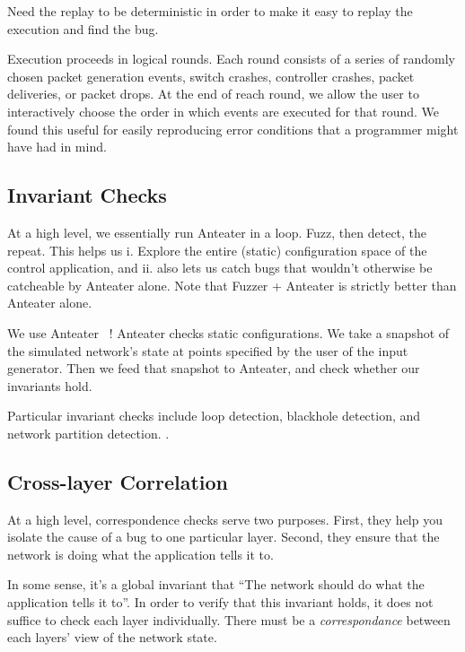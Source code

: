 Need the replay to be deterministic in order to make it easy to replay the execution
and find the bug.

Execution proceeds in logical rounds. Each round consists of a series of
randomly chosen packet generation events, switch crashes, controller crashes,
packet deliveries, or packet drops. At the end of reach round, we allow the user to
interactively choose the order in which events are executed for that round. We
found this useful for easily reproducing error conditions that a programmer
might have had in mind. 


\subsection{Invariant Checks}
\label{sec:invariant_checks}

At a high level, we essentially run Anteater in a loop. Fuzz, then detect, the
repeat. This helps us i. Explore the entire (static) configuration space of the control
application, and ii. also lets us catch bugs that wouldn't otherwise be
catcheable by Anteater alone. Note that Fuzzer + Anteater is strictly better than Anteater alone.

We use Anteater ~\cite{anteater}! Anteater checks static configurations. We take a snapshot of
the simulated network's state at points specified by the user of the input
generator. Then we feed that snapshot to Anteater, and check whether our
invariants hold.

Particular invariant checks include loop detection, blackhole detection, and
network partition detection. . 

\subsection{Cross-layer Correlation}
\label{sec:cross_layer_correlation}

At a high level, correspondence checks serve two purposes. First, they help
you isolate the cause of a bug to one particular layer. Second, they ensure
that the network is doing what the application tells it to.

In some sense, it's a global invariant that ``The network should do what the
application tells it to''. In order to verify that this invariant holds, it
does not suffice to check each layer individually. There must be a {\it
correspondance} between each layers' view of the network state.

